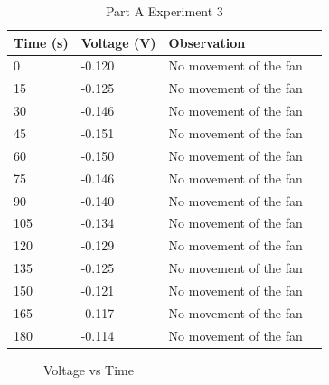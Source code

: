 \documentclass[a4paper, 12pt, english]{article}
\begin{document}
\begin{table}[H]
	\centering
	\caption{Part A Experiment 3}
	\label{tab:partA3}
	\begin{tabular}{@{}llll@{}}
		\toprule
		\textbf{Time (s)} & \textbf{Voltage (V)} & \textbf{Observation}   \\ \midrule
		0                 & -0.120               & No movement of the fan \\
		15                & -0.125               & No movement of the fan \\
		30                & -0.146               & No movement of the fan \\
		45                & -0.151               & No movement of the fan \\
		60                & -0.150               & No movement of the fan \\
		75                & -0.146               & No movement of the fan \\
		90                & -0.140               & No movement of the fan \\
		105               & -0.134               & No movement of the fan \\
		120               & -0.129               & No movement of the fan \\
		135               & -0.125               & No movement of the fan \\
		150               & -0.121               & No movement of the fan \\
		165               & -0.117               & No movement of the fan \\
		180               & -0.114               & No movement of the fan \\ \bottomrule
	\end{tabular}
\end{table}

\begin{figure}[H]
	\centering
	\caption{Voltage vs Time}
	\label{fig:a3}
\end{figure}
\end{document}
